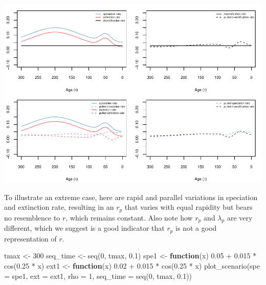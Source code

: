 \documentclass[
]{article}
\newenvironment{Shaded}{\begin{snugshade}}{\end{snugshade}}
\newcommand{\AttributeTok}[1]{\textcolor[rgb]{0.77,0.63,0.00}{#1}}
\newcommand{\ControlFlowTok}[1]{\textcolor[rgb]{0.13,0.29,0.53}{\textbf{#1}}}
\newcommand{\DecValTok}[1]{\textcolor[rgb]{0.00,0.00,0.81}{#1}}
\newcommand{\FloatTok}[1]{\textcolor[rgb]{0.00,0.00,0.81}{#1}}
\newcommand{\FunctionTok}[1]{\textcolor[rgb]{0.00,0.00,0.00}{#1}}
\newcommand{\NormalTok}[1]{#1}
\newcommand{\OtherTok}[1]{\textcolor[rgb]{0.56,0.35,0.01}{#1}}
\newcommand{\SpecialCharTok}[1]{\textcolor[rgb]{0.00,0.00,0.00}{#1}}
\begin{document}
\includegraphics{supplement_files/figure-latex/unnamed-chunk-18-1.pdf}

\pagebreak

To illustrate an extreme case, here are rapid and parallel variations in
speciation and extinction rate, resulting in an \(r_p\) that varies with
equal rapidity but bears no resemblence to \(r\), which remains
constant. Also note how \(r_p\) and \(\lambda_p\) are very different,
which we suggest is a good indicator that \(r_p\) is not a good
representation of \(r\).

\begin{Shaded}
\begin{Highlighting}[]
\NormalTok{tmax }\OtherTok{\textless{}{-}} \DecValTok{300}
\NormalTok{seq\_time }\OtherTok{\textless{}{-}} \FunctionTok{seq}\NormalTok{(}\DecValTok{0}\NormalTok{, tmax, }\FloatTok{0.1}\NormalTok{)}
\NormalTok{spe1 }\OtherTok{\textless{}{-}} \ControlFlowTok{function}\NormalTok{(x) }\FloatTok{0.05} \SpecialCharTok{+} \FloatTok{0.015} \SpecialCharTok{*} \FunctionTok{cos}\NormalTok{(}\FloatTok{0.25} \SpecialCharTok{*}\NormalTok{ x)}
\NormalTok{ext1 }\OtherTok{\textless{}{-}} \ControlFlowTok{function}\NormalTok{(x) }\FloatTok{0.02} \SpecialCharTok{+} \FloatTok{0.015} \SpecialCharTok{*} \FunctionTok{cos}\NormalTok{(}\FloatTok{0.25} \SpecialCharTok{*}\NormalTok{ x)}
\FunctionTok{plot\_scenario}\NormalTok{(}\AttributeTok{spe =}\NormalTok{ spe1, }\AttributeTok{ext =}\NormalTok{ ext1, }\AttributeTok{rho =} \DecValTok{1}\NormalTok{, }\AttributeTok{seq\_time =} \FunctionTok{seq}\NormalTok{(}\DecValTok{0}\NormalTok{,}
\NormalTok{    tmax, }\FloatTok{0.1}\NormalTok{))}
\end{Highlighting}
\end{Shaded}
\end{document}
